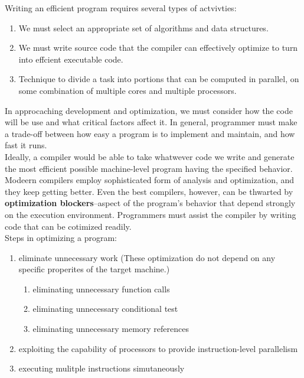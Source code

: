 \documentclass[11pt]{article}
\begin{document}
Writing an efficient program requires several types of actvivties:\\
\begin{enumerate}
\item We must select an appropriate set of algorithms and data structures.\\
\item We must write source code that the compiler can effectively optimize to turn into effcient executable code.\\
\item Technique to divide a task into portions that can be computed in parallel, on some combination of multiple cores and multiple processors.\\
\end{enumerate}

In approcaching development and optimization, we must consider how the code will be use and what critical factors affect it. In general, programmer must make a trade-off between how easy a program is to implement and maintain, and how fast it runs.\\

Ideally, a compiler would be able to take whatwever code we write and generate the most efficient possible machine-level program having the specified behavior. Modeern compilers employ sophisticated form of analysis and optimization, and they keep getting better. Even the best compilers, however, can be thwarted by \textbf{optimization blockers}--aspect of the program's behavior that depend strongly on the execution environment. Programmers must assist the compiler by writing code that can be cotimized readily.\\

Steps in optimizing a program:\\
\begin{enumerate}
\item eliminate unnecessary work (These optimization do not depend on any specific properites of the target machine.)\\
\begin{enumerate}
\item eliminating unnecessary function calls\\
\item eliminating unnecessary conditional test\\
\item eliminating unnecessary memory references\\
\end{enumerate}
\item exploiting the capability of processors to provide instruction-level parallelism\\
\item executing mulitple instructions simutaneously\\
\end{enumerate}
\end{document}
